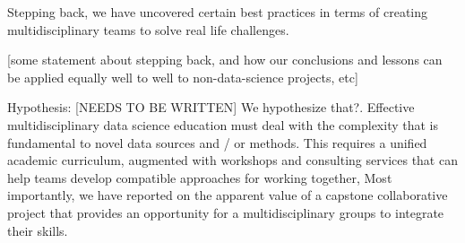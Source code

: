 \documentclass{sig-alternate}
\begin{document}
Stepping back, we have uncovered certain best practices in terms of creating multidisciplinary teams to solve real life challenges. 

[some statement about stepping back, and how our conclusions and lessons can be applied equally well to well to non-data-science projects, etc]

Hypothesis:  [NEEDS TO BE WRITTEN]
We hypothesize that?.
Effective multidisciplinary data science education must deal with the complexity that is fundamental to novel data sources and / or methods. This requires a unified academic curriculum, augmented with workshops and consulting services that can help teams develop compatible approaches for working together, Most importantly, we have reported on the apparent value of a capstone collaborative project that provides an opportunity for a multidisciplinary groups to integrate their skills.
\end{document}
